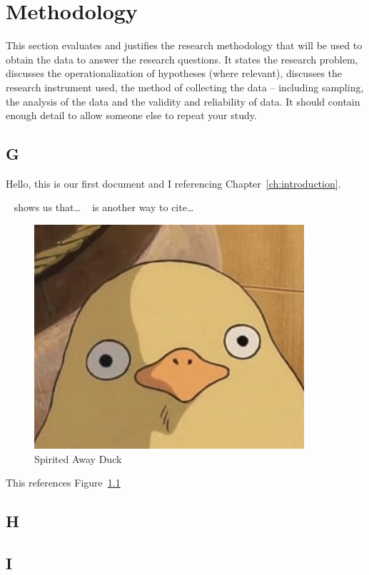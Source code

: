 \chapter{Methodology}\label{ch:methodology}

This section evaluates and justifies the research methodology that will be used to obtain the data to answer the research questions.
It states the research problem, discusses the operationalization of hypotheses (where relevant), discusses the research instrument used, the method of collecting the data – including sampling, the analysis of the data and the validity and reliability of data.
It should contain enough detail to allow someone else to repeat your study.

\section{G}\label{sec:G}
Hello, this is our first document and I referencing Chapter~\ref{ch:introduction}.

~\cite{ani2019victory} shows us that\ldots
~\cite*{ani2019victory} is another way to cite\ldots


\begin{figure}[h]
    \centering
    \includegraphics[width=10cm]{figures/SpiritedAwayDuck3}
    \caption{Spirited Away Duck}
    \label{fig:SpiritedAwayDuck}
\end{figure}


This references Figure~\ref{fig:SpiritedAwayDuck}

\lipsum[1-5]

\section{H}\label{sec:H}
\lipsum[1-5]

\section{I}\label{sec:I}
\lipsum[1-5]